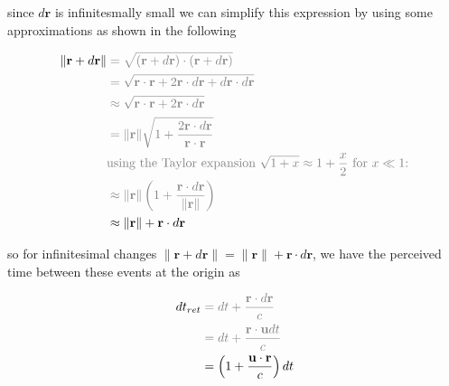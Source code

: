 since $d\mathbf{r}$ is infinitesmally small we can simplify this expression by using some approximations as shown in the following

\begin{equation}
	\begin{aligned}
		\|\mathbf{r} + d\mathbf{r}\| &\color{gray} =  \sqrt{(\mathbf{r} + d\mathbf{r}) \cdot (\mathbf{r} + d\mathbf{r})}                                                                         \\
		                             &\color{gray} = \sqrt{\mathbf{r} \cdot \mathbf{r} + 2 \mathbf{r} \cdot d\mathbf{r} + d\mathbf{r} \cdot d\mathbf{r}}                                         \\
		                             &\color{gray} \approx \sqrt{\mathbf{r} \cdot \mathbf{r} + 2 \mathbf{r} \cdot d\mathbf{r}}                                                                   \\
		                             &\color{gray} = \|\mathbf{r}\| \sqrt{ 1 + \frac{2 \mathbf{r} \cdot d\mathbf{r}}{\mathbf{r} \cdot \mathbf{r}}}                                               \\
		                             &\color{gray} \text{using the Taylor expansion $\sqrt{1 + x} \approx 1 + \frac{x}{2} \text{ for } x \ll 1$:}                                                     \\
		                             &\color{gray} \approx \|\mathbf{r}\| \left(1 + \frac{\mathbf{r} \cdot d\mathbf{r}}{\|\mathbf{r}\| }\right) \\
									 & \approx \|\mathbf{r}\|  + \mathbf{r} \cdot d\mathbf{r}
	\end{aligned}
\end{equation}

so for infinitesimal changes $\|\mathbf{r} + d\mathbf{r}\|= \|\mathbf{r}\|  + \mathbf{r} \cdot d\mathbf{r}$, we have the perceived time between these events at the origin as

\begin{equation}
	\begin{aligned}
		dt_{ret} &\color{gray} =   dt + \frac{\mathbf{r} \cdot d\mathbf{r}}{ c}               \\
		         &\color{gray} = dt + \frac{\mathbf{r} \cdot \mathbf{u} dt}{ c}                 \\
		         & = \left( 1 + \frac{ \mathbf{u} \cdot \mathbf{r} }{ c} \right) dt
	\end{aligned}
\end{equation}

